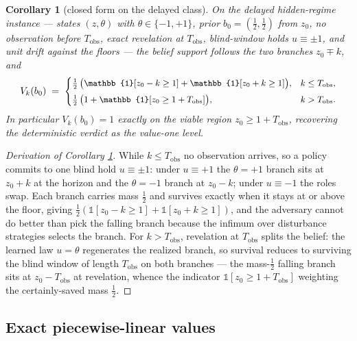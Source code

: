 \documentclass[10pt,twocolumn]{article}
\theoremstyle{plain}
\newtheorem{corollary}[theorem]{Corollary}
\theoremstyle{definition}
\theoremstyle{remark}
\begin{document}
\begin{corollary}[closed form on the delayed class]\label{cor:closed}
On the delayed hidden-regime instance --- states \((z, \theta)\) with
\(\theta \in \{-1, +1\}\), prior \(b_{0} = (\tfrac{1}{2}, \tfrac{1}{2})\)
from \(z_{0}\), no observation before \(T_{\mathrm{obs}}\), exact
revelation at \(T_{\mathrm{obs}}\), blind-window holds
\(u \equiv \pm 1\), and unit drift against the floors --- the belief
support follows the two branches \(z_{0} \mp k\), and
\[
\small
V_{k}(b_{0}) \;=\;
\begin{cases}
\tfrac{1}{2}\,\bigl(\mathbb{1}[z_{0} - k \ge 1] + \mathbb{1}[z_{0} + k \ge 1]\bigr), & k \le T_{\mathrm{obs}},\\[1ex]
\tfrac{1}{2}\,\bigl(1 + \mathbb{1}[z_{0} \ge 1 + T_{\mathrm{obs}}]\bigr), & k > T_{\mathrm{obs}}.
\end{cases}
\]
In particular \(V_{k}(b_{0}) = 1\) exactly on the viable region
\(z_{0} \ge 1 + T_{\mathrm{obs}}\), recovering the deterministic verdict
as the value-one level.
\end{corollary}

\begin{proof}[Derivation of Corollary \ref{cor:closed}]
While \(k \le T_{\mathrm{obs}}\) no observation arrives, so a policy
commits to one blind hold \(u \equiv \pm1\): under \(u \equiv +1\) the
\(\theta = +1\) branch sits at \(z_{0} + k\) at the horizon and the
\(\theta = -1\) branch at \(z_{0} - k\); under \(u \equiv -1\) the roles
swap. Each branch carries mass \(\tfrac{1}{2}\) and survives exactly when
it stays at or above the floor, giving
\(\tfrac{1}{2}(\mathbb{1}[z_{0} - k \ge 1] + \mathbb{1}[z_{0} + k \ge 1])\),
and the adversary cannot do better than pick the falling branch because
the infimum over disturbance strategies selects the branch.
For \(k > T_{\mathrm{obs}}\), revelation at \(T_{\mathrm{obs}}\) splits
the belief: the learned law \(u = \theta\) regenerates the realized
branch, so survival reduces to surviving the blind window of length
\(T_{\mathrm{obs}}\) on both branches --- the mass-\(\tfrac12\) falling
branch sits at \(z_{0} - T_{\mathrm{obs}}\) at revelation, whence the
indicator \(\mathbb{1}[z_{0} \ge 1 + T_{\mathrm{obs}}]\) weighting the
certainly-saved mass \(\tfrac{1}{2}\).
\end{proof}

\subsection{Exact piecewise-linear values}\label{exact}
\end{document}
